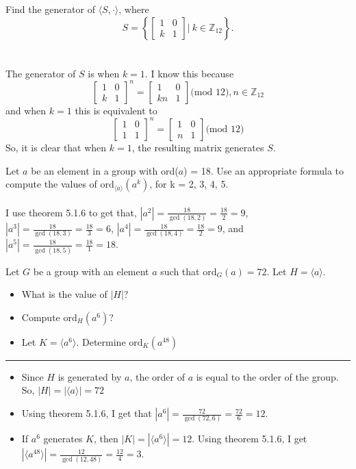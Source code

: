 \documentclass[titlepage]{article}
\newenvironment{problem}[2][Problem]{\begin{trivlist}
\item[\hskip \labelsep {\bfseries #1}\hskip \labelsep {\bfseries #2.}]}{\end{trivlist}}
\begin{document}
\begin{problem}{2}
Find the generator of $\langle S, \cdot \rangle$, where 
$$S = \left\{ \begin{bmatrix}1&0\\k&1 \end{bmatrix} \bigg| \ k \in \mathbb{Z}_{12} \right\}.$$
\\ 
\\
The generator of $S$ is when $k=1$. I know this because 
$$\begin{bmatrix}1&0 \\ k & 1 \end{bmatrix}^n = \begin{bmatrix} 1&0 \\ kn & 1\end{bmatrix} \text{(mod 12)}, n \in \mathbb{Z}_{12}$$
and when $k=1$ this is equivalent to 
$$\begin{bmatrix}1&0 \\ 1 & 1 \end{bmatrix}^n = \begin{bmatrix} 1&0 \\ n & 1\end{bmatrix} \text{(mod 12)}$$
So, it is clear that when $k=1$, the resulting matrix generates $S$.
\end{problem}

\begin{problem}{3}
Let $a$ be an element in a group with ord($a$) = 18. Use an appropriate formula to compute the values of $\text{ord}_{\langle a\rangle}(a^k)$, for k = 2, 3, 4, 5.
\\ \\
I use theorem 5.1.6 to get that, $|a^2| = \frac{18}{\gcd(18,2)} = \frac{18}{2} = 9$, $|a^3| = \frac{18}{\gcd(18,3)} = \frac{18}{3} = 6$, $|a^4| = \frac{18}{\gcd(18,4)} = \frac{18}{2} = 9$, and $|a^5| = \frac{18}{\gcd(18,5)} = \frac{18}{1} = 18$.
\end{problem}

\begin{problem}{4}
Let $G$ be a group with an element $a$ such that $\text{ord}_G(a) = 72$. Let $H = \langle a \rangle$.
\begin{itemize}
\item[(a)] What is the value of $|H|$?
\item[(b)] Compute $\text{ord}_H(a^6)$?
\item[(c)] Let $K = \langle a^6 \rangle.$ Determine $\text{ord}_K(a^{48})$
\end{itemize}
\hrule
\begin{itemize}
\item[(a)] Since $H$ is generated by $a$, the order of $a$ is equal to the order of the group. So, $|H| = |\langle a \rangle| = 72$
\item[(b)] Using theorem 5.1.6, I get that $|a^6| = \frac{72}{\gcd(72,6)} = \frac{72}{6} = 12$.
\item[(c)] If $a^6$ generates $K$, then $|K| = |\langle a^6 \rangle| = 12$. Using theorem 5.1.6, I get $|\langle a^{48}\rangle| = \frac{12}{\gcd(12,48)} = \frac{12}{4} = 3$.
\end{itemize}
\end{problem}
\end{document}
